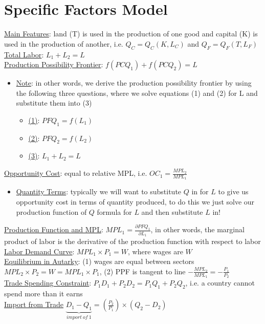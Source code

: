 \documentclass{article}
\begin{document}
\section{Specific Factors Model}
\underline{Main Features}: land (T) is used in the production of one good and capital (K) is used in the production of another, i.e. $Q_{C} = Q_{C}(K,L_{C})$ and $Q_{F}=Q_{F}(T,L_{F})$ \\
\underline{Total Labor}: $L_{1} + L_{2} = L$ \\
\underline{Production Possibility Frontier}: $f(PCQ_{1}) + f(PCQ_{2}) = L$
\begin{itemize}
  \item  \underline{Note}: in other words, we derive the production possibility frontier by using the following three questions, where we solve equations (1) and (2) for L and substitute them into (3)
  \begin{itemize}
    \item  \underline{(1)}: $PFQ_{1} = f(L_{1})$
    \item  \underline{(2)}: $PFQ_{2} = f(L_{2})$
    \item  \underline{(3)}: $L_{1} + L_{2} = L$
  \end{itemize}
\end{itemize}
\underline{Opportunity Cost}: equal to relative MPL, i.e. $OC_{1} = \tfrac{MPL_{2}}{MPL_{1}}$
\begin{itemize}
  \item  \underline{Quantity Terms}: typically we will want to substitute $Q$ in for $L$ to give us opportunity cost in terms of quantity produced, to do this we just solve our production function of $Q$ formula for $L$ and then substitute $L$ in!
\end{itemize}

\underline{Production Function and MPL}: $MPL_{1} = \tfrac{\partial PFQ_{1}}{\partial L_{1}}$, in other words, the marginal product of labor is the derivative of the production function with respect to labor \\
\underline{Labor Demand Curve}: $MPL_{1} \times P_{1} = W$, where wages are $W$ \\
\underline{Equilibrium in Autarky}: (1) wages are equal between sectors $MPL_{2} \times P_{2} = W = MPL_{1} \times P_{1}$, (2) PPF is tangent to  line $-\tfrac{MPL_{2}}{MPL_{1}} = -\tfrac{P_{1}}{P_{2}}$ \\
\underline{Trade Spending Constraint}: $P_{1}D_{1} + P_{2}D_{2} = P_{1}Q_{1} + P_{2}Q_{2}$, i.e. a country cannot spend more than it earns \\
\underline{Import from Trade} $\underbrace{D_{1} - Q_{1}}_{import \ of \ 1} = (\tfrac{P_{2}}{P_{1}}) \times (Q_{2} - D_{2})$ \\
\end{document}
